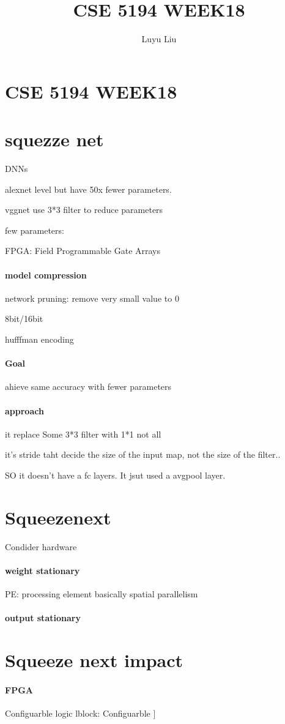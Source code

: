 \documentclass[12pt]{article}
\begin{document}
\author{Luyu Liu}

\newcommand\para{\par\refstepcounter{para}\thepara\space}

\section*{CSE 5194 WEEK18}
\title{CSE 5194 WEEK18}

\section{squezze net}
DNNs

alexnet level but have 50x fewer parameters.

vggnet use 3*3 filter to reduce parameters

few parameters:

FPGA: Field Programmable Gate Arrays

\paragraph{model compression}

network pruning: remove very small value to 0

8bit/16bit

hufffman encoding

\paragraph{Goal}
ahieve same accuracy with fewer parameters

\paragraph{approach}
it replace Some 3*3 filter with 1*1
not all

it's stride taht decide the size of the input map, not the size of the filter..

SO it doesn't have a fc layers. It jsut used a avgpool layer.


\section{Squeezenext}

Condider hardware

\paragraph{weight stationary}
PE: processing element
basically spatial parallelism



\paragraph{output stationary}

\section{Squeeze next impact}

\paragraph{FPGA} Configuarble logic lblock: Configuarble
  ]
\end{document}
